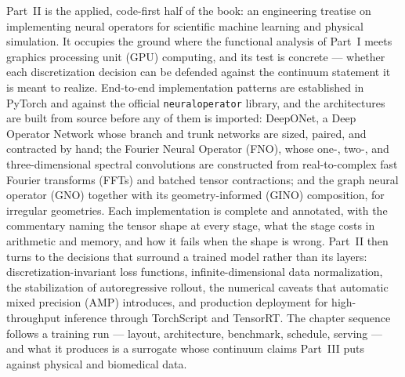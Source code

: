 \noindent Part~II is the applied, code-first half of the book: an engineering
treatise on implementing neural operators for scientific machine learning and
physical simulation. It occupies the ground where the functional analysis of
Part~I meets graphics processing unit (GPU) computing, and its test is concrete
--- whether each discretization decision can be defended against the continuum
statement it is meant to realize. End-to-end implementation patterns are
established in PyTorch and against the official \texttt{neuraloperator}
library, and the architectures are built from source before any of them is
imported: DeepONet, a Deep Operator Network whose branch and trunk networks are
sized, paired, and contracted by hand; the Fourier Neural Operator (FNO), whose
one-, two-, and three-dimensional spectral convolutions are constructed from
real-to-complex fast Fourier transforms (FFTs) and batched tensor contractions;
and the graph neural operator (GNO) together with its geometry-informed (GINO)
composition, for irregular geometries. Each implementation is complete and
annotated, with the commentary naming the tensor shape at every stage, what the
stage costs in arithmetic and memory, and how it fails when the shape is
wrong. Part~II then turns to the decisions that surround a trained model rather
than its layers: discretization-invariant loss functions, infinite-dimensional
data normalization, the stabilization of autoregressive rollout, the numerical
caveats that automatic mixed precision (AMP) introduces, and production
deployment for high-throughput inference through TorchScript and TensorRT. The
chapter sequence follows a training run --- layout, architecture, benchmark,
schedule, serving --- and what it produces is a surrogate whose continuum
claims Part~III puts against physical and biomedical data.

